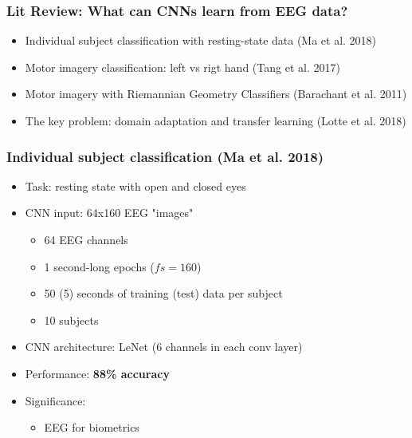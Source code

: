 \documentclass{beamer}
\begin{document}
\begin{frame}
	\frametitle{Lit Review: What can CNNs learn from EEG data?}
	
	\begin{itemize}

		\item Individual subject classification with resting-state data (Ma et al. 2018)

		\item Motor imagery classification: left vs rigt hand (Tang et al. 2017)

		\item Motor imagery with Riemannian Geometry Classifiers (Barachant et al. 2011)
		
		\item The key problem: domain adaptation and transfer learning (Lotte et al. 2018) 

	\end{itemize}

\end{frame}

\begin{frame}
	\frametitle{Individual subject classification (Ma et al. 2018)}
	
	\begin{itemize}

		\item Task: resting state with open and closed eyes

		\item CNN input: 64x160 EEG "images" 
		\begin{itemize}
			\item 64 EEG channels
			\item 1 second-long epochs ($fs = 160$)
			\item 50 (5) seconds of training (test) data per subject 
			\item 10 subjects
		\end{itemize}

		\item CNN architecture: LeNet (6 channels in each conv layer)
	
		\item Performance: \textbf{88\% accuracy}

		\item Significance: 
		\begin{itemize}
			\item EEG for biometrics
		\end{itemize}

	\end{itemize}

\end{frame}
\end{document}
